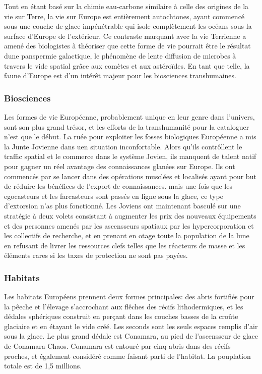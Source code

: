 Tout en étant basé sur la chimie eau-carbone similaire à celle des origines de la vie sur Terre, la vie sur Europe est entièrement autochtones, ayant commencé sous une couche de glace impénétrable qui isole complètement les océans sous la surface d'Europe de l'extérieur. Ce contraste marquant avec la vie Terrienne a amené des biologistes à théoriser que cette forme de vie pourrait être le résultat dune panspermie galactique, le phénomène de lente diffusion de microbes à travers le vide spatial grâce aux comètes et aux astéroïdes. En tant que telle, la faune d'Europe est d'un intérêt majeur pour les biosciences transhumaines. 

\subsubsection{Biosciences} \label{sec:biosciences} 

Les formes de vie Européenne, probablement unique en leur genre dans l'univers, sont son plus grand trésor, et les efforts de la transhumanité pour la cataloguer n'est que le début. La ruée pour exploiter les fosses biologiques Européenne a mis la Junte Jovienne dans uen situation inconfortable. Alors qu'ils contrôllent le traffic spatial et le commerce dans le système Jovien, ils manquent de talent natif pour gagner un réel avantage des connaissances glanées sur Europe. Ils ont commencés par se lancer dans des opérations musclées et localisés ayant pour but de réduire les bénéfices de l'export de connaissances. mais une fois que les egocasteurs et les farcasteurs sont passés en ligne sous la glace, ce type d'extorsion n'as plus fonctionné. Les Joviens ont maintenant basculé sur une stratégie à deux volets consistant à augmenter les prix des nouveaux équipements et des personnes amenés par les ascensseurs spatiaux par les hypercorporation et les collectifs de recherche, et en prenant en otage toute la population de la lune en refusant de livrer les ressources clefs telles que les réacteurs de masse et les éléments rares si les taxes de protection ne sont pas payées. 

\subsubsection{Habitats} \label{sec:habitats-4} 

Les habitats Européens prennent deux formes principales: des abris fortifiés pour la pêeche et l'élevage s'accrochant aux flêches des récifs lithodermiques, et les dédales sphériques construit en perçant dans les couches basses de la croûte glaciaire et en étayant le vide créé. Les seconds sont les seuls espaces remplis d'air sous la glace. Le plus grand dédale est Conamara, au pied de l'ascensseur de glace de Conamara Chaos. Conamara est entouré par cinq abris dans des récifs proches, et également considéré comme faisant parti de l'habitat. La pouplation totale est de 1,5 millions. 

